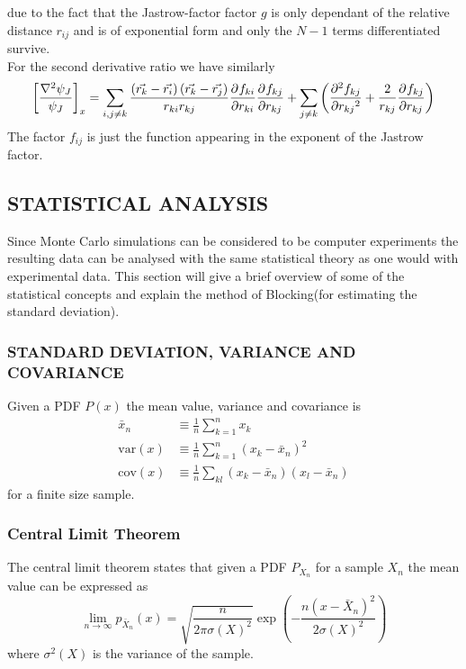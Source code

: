 \documentclass[a4paper, hidelinks, 10pt]{article}\usepackage[utf8]{inputenc}
\let\oldsubsection\subsection
\renewcommand{\subsection}[1]{\centering \oldsubsection{{#1}} \justifying}
\newcommand{\rarr}{\rightarrow} %
\newcommand{\suml}[2]{\sum\limits_{#1=1}^{#2}}
\begin{document}
    due to the fact that the Jastrow-factor factor $g$ is only dependant of the
    relative distance $r_{ij}$ and is of exponential form and only the $N-1$
    terms differentiated survive. \\
    For the second derivative ratio we have similarly
        \begin{equation}
            \left[\frac{\nabla^2\psi_J}{\psi_J}\right]_x = \sum\limits_{i,j\neq
            k} \frac{\left(\vec{r_k} - \vec{r_i}\right) \left(\vec{r_k} -
            \vec{r_j}\right)}{r_{ki}r_{kj}}
            \prd{r_{ki}}[f_{ki}]\prd{r_{kj}}[f_{kj}] + \sum\limits_{j\neq k}
            \left(\prd{r_{kj}}[f_{kj}][2] +
            \frac{2}{r_{kj}}\prd{r_{kj}}[f_{kj}]\right)
            \label{eq:jastoptsecder}
        \end{equation}
    The factor $f_{ij}$ is just the function appearing in the exponent of the
    Jastrow factor.

\subsection{STATISTICAL ANALYSIS}
\label{sub:statistical_analysis}
    Since Monte Carlo simulations can be considered to be computer experiments
    the resulting data can be analysed with the same statistical theory as one
    would with experimental data. This section will give a brief overview of
    some of the statistical concepts and explain the method of Blocking(for
    estimating the standard deviation).

\subsubsection{STANDARD DEVIATION, VARIANCE AND COVARIANCE}
\label{ssub:standard_deviation__variance_and_covariance}
    Given a PDF $P(x)$ the mean value, variance and covariance is
        \begin{align}
            \bar{x}_n &\equiv \frac{1}{n}\suml{k}{n} x_k \\
            \text{var}(x) &\equiv
            \frac{1}{n}\suml{k}{n}\left(x_k-\bar{x}_n\right)^2 \\
            \text{cov}(x) &\equiv \frac{1}{n}\sum\limits_{kl}
            \left(x_k-\bar{x}_n\right)\left(x_l-\bar{x}_n\right)
            \label{eq:statfinite}
        \end{align}
    for a finite size sample.

\subsubsection{Central Limit Theorem}
\label{ssub:central_limit_theorem}
    The central limit theorem states that given a PDF $P_{X_n}$ for a sample $X_n$
    the mean value can be expressed as
        \begin{equation}
            \lim\limits_{n\rarr\infty}p_{\bar{X}_n}(x) =
            \sqrt{\frac{n}{2\pi\sigma(X)^2}}
            \exp(-\frac{n(x-\bar{X}_n)^2}{2\sigma(X)^2})
            \label{eq:centrallimit}
        \end{equation}
    where $\sigma^2(X)$ is the variance of the sample.
\end{document}
